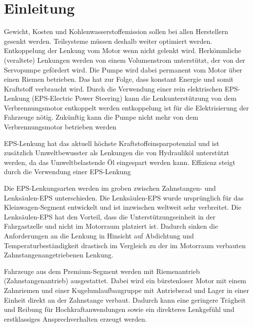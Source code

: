 \chapter{Einleitung}
\label{cha:einleitung}
%

Gewicht, Kosten und Kohlenwasserstoffemission sollen bei allen Herstellern gesenkt werden.
Teilsysteme müssen deshalb weiter optimiert werden.
Entkoppelung der Lenkung vom Motor wenn nicht gelenkt wird.
Herkömmliche (veraltete) Lenkungen werden von einem Volumenstrom unterstützt, der von der Servopumpe gefördert wird. 
Die Pumpe wird dabei permanent vom Motor über einen Riemen betrieben. 
Das hat zur Folge, dass konstant Energie und somit Kraftstoff verbraucht wird. 
Durch die Verwendung einer rein elektrischen EPS-Lenkung (EPS-Electric Power Steering) kann die Lenkunterstützung von dem Verbrennungsmotor entkoppelt werden
entkoppelung ist für die Elektrisierung der Fahrzeuge nötig. 
Zukünftig kann die Pumpe nicht mehr von dem Verbrennungsmotor betrieben werden

EPS-Lenkung hat das aktuell höchste Kraftstoffeinsparpotenzial und ist zusätzlich Umweltbewusster als Lenkungen die von Hydrauliköl unterstützt werden, da das Umweltbelastende Öl eingespart werden kann.  
Effizienz steigt durch die Verwendung einer EPS-Lenkung 

Die EPS-Lenkungsarten werden im groben zwischen Zahnstangen- und Lenksäulen-EPS unterschieden. 
Die Lenksäulen-EPS wurde ursprünglich für das Kleinwagen-Segment entwickelt und ist inzwischen weltweit sehr verbreitet.
Die Lenksäulen-EPS hat den Vorteil, dass die Unterstützungseinheit in der Fahrgastzelle und nicht im Motorraum platziert ist.
Dadurch sinken die Anforderungen an die Lenkung in Hinsicht auf Abdichtung und Temperaturbeständigkeit drastisch im Vergleich zu der im Motorraum verbauten Zahnstangenangetriebenen Lenkung. 
   
Fahrzeuge aus dem Premium-Segment werden mit Riemenantrieb (Zahnstangenantrieb) ausgestattet. 
Dabei wird ein bürstenloser Motor mit einem Zahnriemen und einer Kugelumlaufbaugruppe mit Antriebsrad und Lager in einer Einheit direkt an der Zahnstange verbaut.
Dadurch kann eine geringere Trägheit und Reibung für Hochkraftanwendungen sowie ein direkteres Lenkgefühl und erstklassiges Ansprechverhalten erzeugt werden. 


